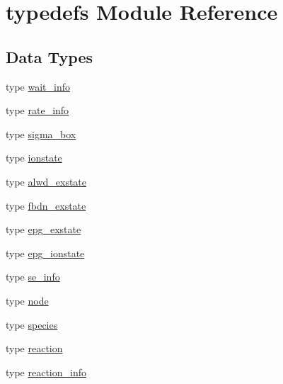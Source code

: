 \hypertarget{namespacetypedefs}{
\section{typedefs Module Reference}
\label{namespacetypedefs}
}
\subsection*{Data Types}
\begin{DoxyCompactItemize}
\item 
type \hyperlink{typetypedefs_1_1wait__info}{wait\_\-info}
\item 
type \hyperlink{typetypedefs_1_1rate__info}{rate\_\-info}
\item 
type \hyperlink{typetypedefs_1_1sigma__box}{sigma\_\-box}
\item 
type \hyperlink{typetypedefs_1_1ionstate}{ionstate}
\item 
type \hyperlink{typetypedefs_1_1alwd__exstate}{alwd\_\-exstate}
\item 
type \hyperlink{typetypedefs_1_1fbdn__exstate}{fbdn\_\-exstate}
\item 
type \hyperlink{typetypedefs_1_1epg__exstate}{epg\_\-exstate}
\item 
type \hyperlink{typetypedefs_1_1epg__ionstate}{epg\_\-ionstate}
\item 
type \hyperlink{typetypedefs_1_1se__info}{se\_\-info}
\item 
type \hyperlink{typetypedefs_1_1node}{node}
\item 
type \hyperlink{typetypedefs_1_1species}{species}
\item 
type \hyperlink{typetypedefs_1_1reaction}{reaction}
\item 
type \hyperlink{typetypedefs_1_1reaction__info}{reaction\_\-info}
\end{DoxyCompactItemize}
